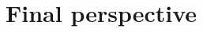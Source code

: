 \documentclass[b5paper, 12pt]{book}
\begin{document}





% 
% 

\part{Final perspective}



\begingroup
\small

 
\endgroup

% 
% 

% 
% 
\end{document}
